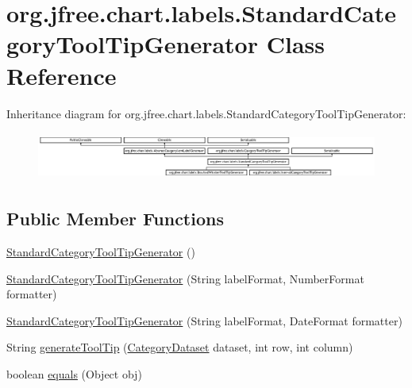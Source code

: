 \hypertarget{classorg_1_1jfree_1_1chart_1_1labels_1_1_standard_category_tool_tip_generator}{}\section{org.\+jfree.\+chart.\+labels.\+Standard\+Category\+Tool\+Tip\+Generator Class Reference}
\label{classorg_1_1jfree_1_1chart_1_1labels_1_1_standard_category_tool_tip_generator}
Inheritance diagram for org.\+jfree.\+chart.\+labels.\+Standard\+Category\+Tool\+Tip\+Generator\+:\begin{figure}[H]
\begin{center}
\leavevmode
\includegraphics[height=1.590909cm]{classorg_1_1jfree_1_1chart_1_1labels_1_1_standard_category_tool_tip_generator}
\end{center}
\end{figure}
\subsection*{Public Member Functions}
\begin{DoxyCompactItemize}
\item 
\mbox{\hyperlink{classorg_1_1jfree_1_1chart_1_1labels_1_1_standard_category_tool_tip_generator_a2c8cdcfa6f402e94e851ee7a0886b6a6}{Standard\+Category\+Tool\+Tip\+Generator}} ()
\item 
\mbox{\hyperlink{classorg_1_1jfree_1_1chart_1_1labels_1_1_standard_category_tool_tip_generator_a058e1e65283adb59d110b0447e667662}{Standard\+Category\+Tool\+Tip\+Generator}} (String label\+Format, Number\+Format formatter)
\item 
\mbox{\hyperlink{classorg_1_1jfree_1_1chart_1_1labels_1_1_standard_category_tool_tip_generator_a9877bb981ba67a928a611ee6a19cc262}{Standard\+Category\+Tool\+Tip\+Generator}} (String label\+Format, Date\+Format formatter)
\item 
String \mbox{\hyperlink{classorg_1_1jfree_1_1chart_1_1labels_1_1_standard_category_tool_tip_generator_afd101d9a9d6376c6bfb8eacdd51e99ad}{generate\+Tool\+Tip}} (\mbox{\hyperlink{interfaceorg_1_1jfree_1_1data_1_1category_1_1_category_dataset}{Category\+Dataset}} dataset, int row, int column)
\item 
boolean \mbox{\hyperlink{classorg_1_1jfree_1_1chart_1_1labels_1_1_standard_category_tool_tip_generator_a2158b93093c2e0c62e6e20da4abba3d7}{equals}} (Object obj)
\end{DoxyCompactItemize}
